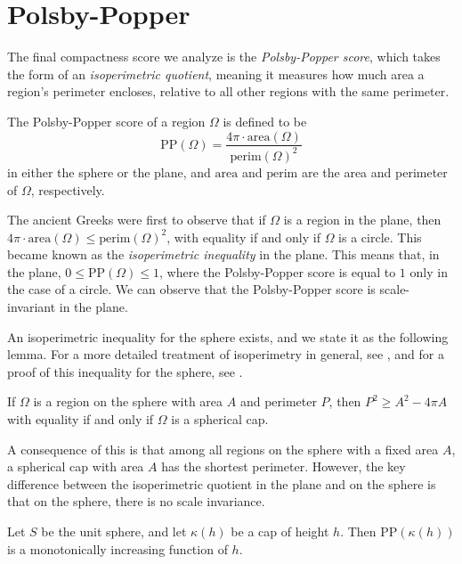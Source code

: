 \section{Polsby-Popper}\label{sec:pp}
The final compactness score we analyze is the \textit{Polsby-Popper
score}, which takes the form of an \textit{isoperimetric quotient},
meaning it measures how much area a region's perimeter encloses,
relative to all other regions with the same perimeter.

\begin{definition}\label{def:pp}
  The Polsby-Popper score of a region $\Omega$ is defined to be
  $$\mathrm{PP}(\Omega) = \frac{4\pi
  \cdot\mathrm{area}(\Omega)}{\mathrm{perim}(\Omega)^2}$$ 
in either the sphere or the plane, and
  $\mathrm{area}$ and $\mathrm{perim}$ are the area and perimeter of
    $\Omega$, respectively.
\end{definition}

The ancient Greeks were first to observe that if $\Omega$ is a region
in the plane, then $4\pi\cdot\mathrm{area}(\Omega)\leq
\mathrm{perim}(\Omega)^2$, with equality if and only if $\Omega$ is
a circle. This became known as the \textit{isoperimetric inequality} in
the plane.  This means that, in the plane, $0\le \mathrm{PP}(\Omega)\le 1$,
where the Polsby-Popper score is equal to $1$ only in the case of
a circle. We can observe that the Polsby-Popper score is scale-invariant in
the plane. 

An isoperimetric inequality for the sphere exists, and we
state it as the following lemma.  For a more detailed treatment of
isoperimetry in general, see \cite{osserman1979bonnesen}, and for
a proof of this inequality for the sphere, see \cite{rado}.

\begin{lemma}
  If $\Omega$ is a region on the sphere with area
  $A$ and perimeter $P$, then $P^2\geq A^2-4\pi A$ with equality if
  and only if $\Omega$ is a spherical cap.
\end{lemma}
A consequence of this is that among all regions on the sphere with
a fixed area $A$, a spherical cap with area $A$ has the shortest
perimeter. However, the key difference between the isoperimetric 
quotient in the plane and on the sphere is that on the 
sphere, there is no scale invariance.


\begin{lemma}\label{lem:ppscale}
  Let $S$ be the unit sphere, and let $\kappa(h)$ be a cap of height
  $h$.  Then $\mathrm{PP}(\kappa(h))$ is
  a monotonically increasing function of $h$.
\end{lemma}


